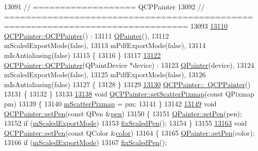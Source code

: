 \begin{DoxyCode}
13091 \textcolor{comment}{// =================== QCPPainter}
13092 \textcolor{comment}{// ================================================================================}
13093 
\hypertarget{a00115_source_l13110}{}\hyperlink{a00047_a3c52cb0f43f34573d29bea487da28fe8}{13110} \hyperlink{a00047_a3c52cb0f43f34573d29bea487da28fe8}{QCPPainter::QCPPainter}() :
13111   \hyperlink{a00060}{QPainter}(),
13112   mScaledExportMode(false),
13113   mPdfExportMode(false),
13114   mIsAntialiasing(false)
13115 \{
13116 \}
13117 
\hypertarget{a00115_source_l13122}{}\hyperlink{a00047_ae58dbb1795ddc4351ab324dc9898aa22}{13122} \hyperlink{a00047_a3c52cb0f43f34573d29bea487da28fe8}{QCPPainter::QCPPainter}(QPaintDevice *device) :
13123   \hyperlink{a00060}{QPainter}(device),
13124   mScaledExportMode(false),
13125   mPdfExportMode(false),
13126   mIsAntialiasing(false)
13127 \{
13128 \}
13129 
\hypertarget{a00115_source_l13130}{}\hyperlink{a00047_aa8491da26c0bf7704a93e2dcbb0c5ba1}{13130} \hyperlink{a00047_aa8491da26c0bf7704a93e2dcbb0c5ba1}{QCPPainter::~QCPPainter}()
13131 \{
13132 \}
13133 
\hypertarget{a00115_source_l13138}{}\hyperlink{a00047_a0f636de68b40d2e169ab15a8ca067107}{13138} \textcolor{keywordtype}{void} \hyperlink{a00047_a0f636de68b40d2e169ab15a8ca067107}{QCPPainter::setScatterPixmap}(\textcolor{keyword}{const} QPixmap pm)
13139 \{
13140   \hyperlink{a00047_a20d67229e0977ad7ce3a3c7349cbd59c}{mScatterPixmap} = pm;
13141 \}
13142 
\hypertarget{a00115_source_l13149}{}\hyperlink{a00047_af9c7a4cd1791403901f8c5b82a150195}{13149} \textcolor{keywordtype}{void} \hyperlink{a00047_af9c7a4cd1791403901f8c5b82a150195}{QCPPainter::setPen}(\textcolor{keyword}{const} QPen &\hyperlink{a00116_a1f13fffa0a0faac34ec342973e613a4a}{pen})
13150 \{
13151   \hyperlink{a00116_a499165f4744b6d22da7b24295910fb2c}{QPainter::setPen}(pen);
13152   \textcolor{keywordflow}{if} (\hyperlink{a00047_a967991f4d003d1fca9f67d9152ef651e}{mScaledExportMode})
13153     \hyperlink{a00047_a27af07a62c335faf79191b797306b218}{fixScaledPen}();
13154 \}
13155 
\hypertarget{a00115_source_l13163}{}\hyperlink{a00047_a5c4d88f21564e156e88ef807f7cf0003}{13163} \textcolor{keywordtype}{void} \hyperlink{a00047_af9c7a4cd1791403901f8c5b82a150195}{QCPPainter::setPen}(\textcolor{keyword}{const} QColor &\hyperlink{a00116_ae35093fbf4f645dcefd930ca8c68b622}{color})
13164 \{
13165   \hyperlink{a00116_a499165f4744b6d22da7b24295910fb2c}{QPainter::setPen}(color);
13166   \textcolor{keywordflow}{if} (\hyperlink{a00047_a967991f4d003d1fca9f67d9152ef651e}{mScaledExportMode})
13167     \hyperlink{a00047_a27af07a62c335faf79191b797306b218}{fixScaledPen}();

\end{DoxyCode}
